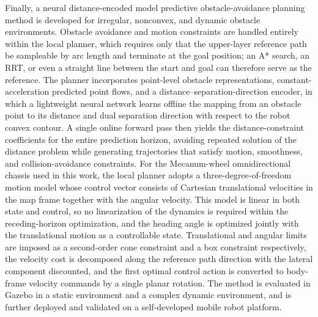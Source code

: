 Finally, a neural distance-encoded model predictive obstacle-avoidance planning method is developed for irregular, nonconvex, and dynamic obstacle environments. Obstacle avoidance and motion constraints are handled entirely within the local planner, which requires only that the upper-layer reference path be sampleable by arc length and terminate at the goal position; an A* search, an RRT, or even a straight line between the start and goal can therefore serve as the reference. The planner incorporates point-level obstacle representations, constant-acceleration predicted point flows, and a distance--separation-direction encoder, in which a lightweight neural network learns offline the mapping from an obstacle point to its distance and dual separation direction with respect to the robot convex contour. A single online forward pass then yields the distance-constraint coefficients for the entire prediction horizon, avoiding repeated solution of the distance problem while generating trajectories that satisfy motion, smoothness, and collision-avoidance constraints. For the Mecanum-wheel omnidirectional chassis used in this work, the local planner adopts a three-degree-of-freedom motion model whose control vector consists of Cartesian translational velocities in the map frame together with the angular velocity. This model is linear in both state and control, so no linearization of the dynamics is required within the receding-horizon optimization, and the heading angle is optimized jointly with the translational motion as a controllable state. Translational and angular limits are imposed as a second-order cone constraint and a box constraint respectively, the velocity cost is decomposed along the reference path direction with the lateral component discounted, and the first optimal control action is converted to body-frame velocity commands by a single planar rotation. The method is evaluated in Gazebo in a static environment and a complex dynamic environment, and is further deployed and validated on a self-developed mobile robot platform.

